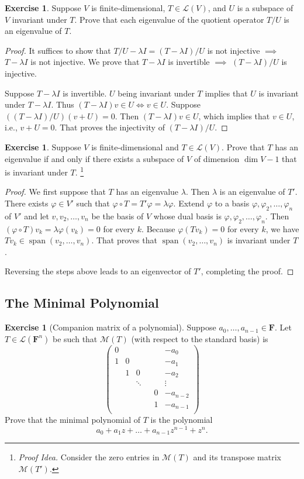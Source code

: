 \documentclass[nofonts,colorlinks]{tufte-handout}
\theoremstyle{plain} %
\theoremstyle{definition}
\newtheorem{exer}[thm]{Exercise}
\theoremstyle{remark}
\def\idea{\textit{\color[rgb]{0,0,.55}Proof Idea. }}
\renewcommand{\phi}{\varphi}
\newcommand{\F}{\mathbf{F}}
\renewcommand{\L}{\mathcal{L}}
\newcommand{\M}{\mathcal{M}}
\DeclareMathOperator{\spn}{span}
\begin{document}
\begin{exer}
	Suppose $V$ is finite-dimensional, $T\in\L(V)$, and $U$ is a subspace of $V$ invariant under $T$. Prove that each eigenvalue of the quotient operator $T/U$ is an eigenvalue of $T$.
\end{exer}
\begin{proof}
	It suffices to show that $T/U-\lambda I=(T-\lambda I)/U$ is not injective $\implies$ $T-\lambda I$ is not injective. We prove that $T-\lambda I$ is invertible $\implies$ $(T-\lambda I)/U$ is injective.

	Suppose $T-\lambda I$ is invertible. $U$ being invariant under $T$ implies that $U$ is invariant under $T-\lambda I$. Thus $(T-\lambda I)v\in U\iff v\in U$. Suppose $((T-\lambda I)/U)(v+U)=0$. Then $(T-\lambda I)v\in U$, which implies that $v\in U$, i.e., $v+U=0$. That proves the injectivity of $(T-\lambda I)/U$.
\end{proof}

\begin{exer}
	Suppose $V$ is finite-dimensional and $T\in\L(V)$. Prove that $T$ has an eigenvalue if and only if there exists a subspace of $V$ of dimension $\dim V-1$ that is invariant under $T$.%
	\footnote{\idea Consider the zero entries in $\M(T)$ and its transpose matrix $\M(T')$.}
\end{exer}
\begin{proof}
	We first suppose that $T$ has an eigenvalue $\lambda$. Then $\lambda$ is an eigenvalue of $T'$. There exists $\phi\in V'$ such that $\phi\circ T=T'\phi=\lambda\phi$. Extend $\phi$ to a basis $\phi,\phi_2,\dots,\phi_n$ of $V'$ and let $v,v_2,\dots,v_n$ be the basis of $V$ whose dual basis is $\phi,\phi_2,\dots,\phi_n$. Then $(\phi\circ T)v_k=\lambda\phi(v_k)=0$ for every $k$. Because $\phi(T v_k)=0$ for every $k$, we have $Tv_k\in\spn(v_2,\dots,v_n)$. That proves that $\spn(v_2,\dots,v_n)$ is invariant under $T$.
	
	Reversing the steps above leads to an eigenvector of $T'$, completing the proof.
\end{proof}


\subsection{The Minimal Polynomial}
\begin{exer}[Companion matrix of a polynomial]
	Suppose $a_0,\dots,a_{n-1}\in\F$. Let $T\in\L(\F^n)$ be such that $\M(T)$ (with respect to the standard basis) is
	\[\begin{pmatrix}
		0&&&&&-a_0\\
		1&0&&&&-a_1\\
		&1&0&&&-a_2\\
		&&\ddots&&&\vdots\\
		&&&&0&-a_{n-2}\\
		&&&&1&-a_{n-1}\\
	\end{pmatrix}\]
	Prove that the minimal polynomial of $T$ is the polynomial
	\[a_0+a_1z+\dots+a_{n-1}z^{n-1}+z^n.\]
\end{exer}
\end{document}
